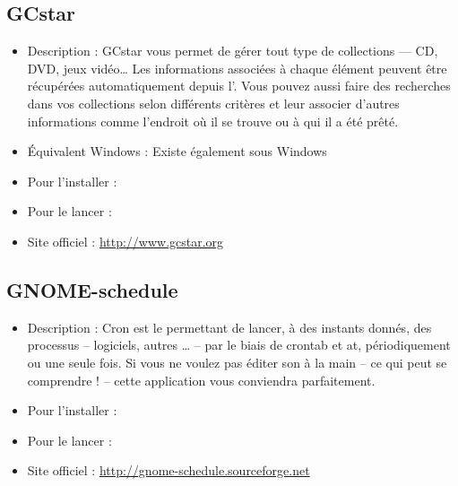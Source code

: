 \subsection{GCstar}
\begin{itemize}
\begingroup
{}
\item Description : GCstar vous permet de gérer tout type de collections --- CD, DVD, jeux vidéo\ldots{} Les informations associées à chaque élément peuvent être récupérées automatiquement depuis l'. Vous pouvez aussi faire des recherches dans vos collections selon différents critères et leur associer d'autres informations comme l'endroit où il se trouve ou à qui il a été prêté.{\par}
\item Équivalent Windows : Existe également sous Windows{\par}
\item Pour l'installer : 
\item Pour le lancer : 
\item Site officiel : \url{http://www.gcstar.org}{\par}
\endgroup
\end{itemize}

\subsection{GNOME-schedule}
\begin{itemize}
\begingroup
{}
\item Description : Cron est le  permettant de lancer, à des instants donnés, des processus -- logiciels, autres \ldots{} -- par le biais de crontab et at, périodiquement ou une seule fois. Si vous ne voulez pas éditer son  à la main -- ce qui peut se comprendre ! -- cette application vous conviendra parfaitement.{\par}
\endgroup
\item Pour l'installer : 
\item Pour le lancer : 
\item Site officiel : \url{http://gnome-schedule.sourceforge.net}{\par}
\end{itemize}

